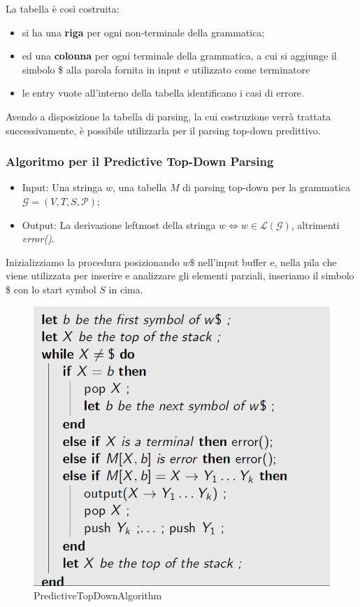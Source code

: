 \documentclass[class=book, crop=false, oneside, 12pt]{standalone}
\begin{document}
La tabella è così costruita:
\begin{itemize}
    \item si ha una \textbf{riga} per ogni non-terminale della grammatica;
    \item ed una \textbf{colonna} per ogni terminale della grammatica, a cui si aggiunge il simbolo \$ alla parola fornita in input e utilizzato come terminatore
    \item le entry vuote all'interno della tabella identificano i casi di errore.
\end{itemize}

Avendo a disposizione la tabella di parsing, la cui costruzione verrà trattata successivamente, è possibile utilizzarla per il parsing top-down predittivo.

\subsubsection{Algoritmo per il Predictive Top-Down Parsing}
\begin{itemize}
    \item Input: Una stringa \(w\), una tabella \(M\) di parsing top-down per la grammatica \(\mathcal{G} = (V, T, S, \mathcal{P})\);
    \item Output: La derivazione leftmost della stringa \(w \iff w \in \mathcal{L(G)}\), altrimenti \emph{error()}.
\end{itemize}
Inizializziamo la procedura posizionando \(w\$\) nell'input buffer e, nella pila che viene utilizzata per inserire e analizzare gli elementi parziali, inseriamo il simbolo \$ con lo start symbol \(S\) in cima.
\begin{figure}[H]
    \centering
    \includegraphics[width=.7\textwidth,keepaspectratio]{PredictiveTopDownAlgorithm.png}
    \caption{PredictiveTopDownAlgorithm}
    \label{PredictiveTopDownAlgorithm}
\end{figure}
\end{document}
